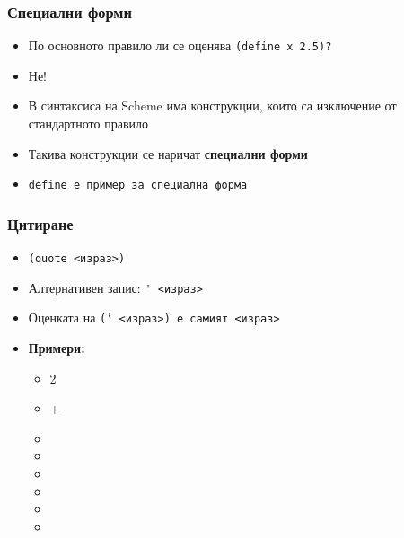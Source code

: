 \documentclass{beamer}
\begin{document}
\begin{frame}
  \frametitle{Специални форми}

  \begin{itemize}[<+->]
  \item По основното правило ли се оценява \tt{(define x 2.5)}?
  \item \alert{Не!}
  \item В синтаксиса на Scheme има конструкции, които са изключение от стандартното правило
  \item Такива конструкции се наричат \textbf{специални форми}
  \item \tt{define} е пример за специална форма
  \end{itemize}
\end{frame}

\begin{frame}
  \frametitle{Цитиране}

  \begin{itemize}[<+->]
  \item \tt{\alert{(quote} <израз>\alert)}
  \item Алтернативен запис: \tt{\alert' <израз>}
  \item Оценката на \tt{(' <израз>)} е самият \tt{<израз>}
  \item \textbf{Примери:}
    \begin{itemize}
    \item {}2
    \item {}+
    \item {}
    \item {}
    \item {}
    \item {}
    \item {}
    \item {}
    \end{itemize}
  \end{itemize}
\end{frame}
\end{document}
